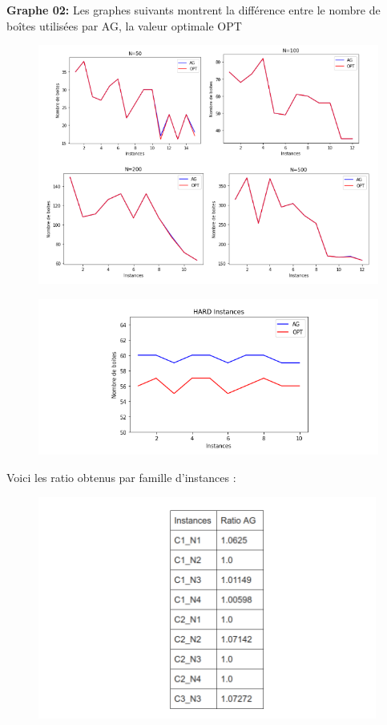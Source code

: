 \documentclass{article}
\begin{document}
\textbf{Graphe 02:}
Les graphes suivants montrent la différence entre le nombre de boîtes utilisées par AG, la valeur optimale OPT
\begin{figure}[H]
  \includegraphics[width=\linewidth]{../figures/pic08.PNG}
\end{figure}
\begin{figure}[H]
  \includegraphics[width=\linewidth]{../figures/pic09.PNG}
\end{figure}
Voici les ratio obtenus par famille d’instances :
\begin{figure}[H]
  \includegraphics[width=\linewidth]{../figures/pic10.PNG}
\end{figure}
\end{document}
